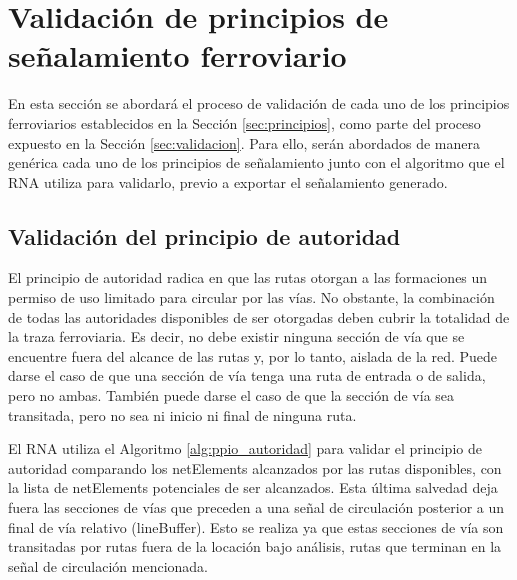 \section{Validación de principios de señalamiento ferroviario}
	\label{sec:validar_principios}
	
				
	En esta sección se abordará el proceso de validación de cada uno de los principios ferroviarios establecidos en la Sección \ref{sec:principios}, como parte del proceso expuesto en la Sección \ref{sec:validacion}. Para ello, serán abordados de manera genérica cada uno de los principios de señalamiento junto con el algoritmo que el RNA utiliza para validarlo, previo a exportar el señalamiento generado.
	
	\subsection{Validación del principio de autoridad}
		
		El principio de autoridad radica en que las rutas otorgan a las formaciones un permiso de uso limitado para circular por las vías. No obstante, la combinación de todas las autoridades disponibles de ser otorgadas deben cubrir la totalidad de la traza ferroviaria. Es decir, no debe existir ninguna sección de vía que se encuentre fuera del alcance de las rutas y, por lo tanto, aislada de la red. Puede darse el caso de que una sección de vía tenga una ruta de entrada o de salida, pero no ambas. También puede darse el caso de que la sección de vía sea transitada, pero no sea ni inicio ni final de ninguna ruta.
		
		El RNA utiliza el Algoritmo \ref{alg:ppio_autoridad} para validar el principio de autoridad comparando los netElements alcanzados por las rutas disponibles, con la lista de netElements potenciales de ser alcanzados. Esta última salvedad deja fuera las secciones de vías que preceden a una señal de circulación posterior a un final de vía relativo (lineBuffer). Esto se realiza ya que estas secciones de vía son transitadas por rutas fuera de la locación bajo análisis, rutas que terminan en la señal de circulación mencionada.

